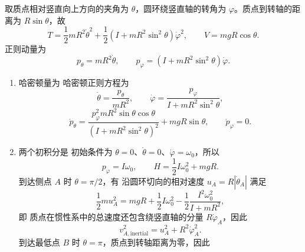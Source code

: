 \begin{question}[转动圆环上的滑块]
\begin{solution}
取质点相对竖直向上方向的夹角为 $\theta$，圆环绕竖直轴的转角为 $\varphi$。质点到转轴的距离为 $R\sin\theta$，故
\[
  T=\frac12mR^2\dot\theta^2
  +\frac12\left(I+mR^2\sin^2\theta\right)\dot\varphi^2,
  \qquad
  V=mgR\cos\theta .
\]
正则动量为
\[
  p_\theta=mR^2\dot\theta,
  \qquad
  p_\varphi=\left(I+mR^2\sin^2\theta\right)\dot\varphi .
\]
\begin{enumerate}
  \item 哈密顿量为
  哈密顿正则方程为
  \[
    \dot\theta=\frac{p_\theta}{mR^2},
    \qquad
    \dot\varphi=\frac{p_\varphi}{I+mR^2\sin^2\theta},
  \]
  \[
    \dot p_\theta=\frac{p_\varphi^2mR^2\sin\theta\cos\theta}
    {(I+mR^2\sin^2\theta)^2}+mgR\sin\theta,
    \qquad
    \dot p_\varphi=0 .
  \]
  \item 两个初积分是
  初始条件为 $\theta=0$、$\dot\theta=0$、$\dot\varphi=\omega_0$，所以
  \[
    p_\varphi=I\omega_0,
    \qquad
    H=\frac12I\omega_0^2+mgR .
  \]
  到达侧点 $A$ 时 $\theta=\pi/2$，有
  沿圆环切向的相对速度 $u_A=R|\dot\theta_A|$ 满足
  \[
    \frac12m u_A^2
    =mgR+\frac12I\omega_0^2-\frac12\frac{I^2\omega_0^2}{I+mR^2},
  \]
  即
  质点在惯性系中的总速度还包含绕竖直轴的分量 $R\dot\varphi_A$，因此
  \[
    v_{A,\mathrm{inertial}}^2
    =u_A^2+R^2\dot\varphi_A^2 .
  \]
  到达最低点 $B$ 时 $\theta=\pi$，质点到转轴距离为零，因此
\end{enumerate}
\end{solution}

\end{question}

